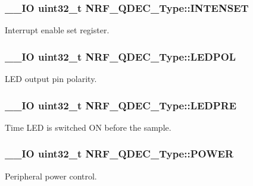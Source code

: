 \subsubsection[{I\+N\+T\+E\+N\+S\+E\+T}]{\setlength{\rightskip}{0pt plus 5cm}\+\_\+\+\_\+\+I\+O uint32\+\_\+t N\+R\+F\+\_\+\+Q\+D\+E\+C\+\_\+\+Type\+::\+I\+N\+T\+E\+N\+S\+E\+T}\label{struct_n_r_f___q_d_e_c___type_a147145269532ef25ff7c7ef4ad3dda64}
Interrupt enable set register. \hypertarget{struct_n_r_f___q_d_e_c___type_ab272c8158314b357bff755f979df7978}{}
\subsubsection[{L\+E\+D\+P\+O\+L}]{\setlength{\rightskip}{0pt plus 5cm}\+\_\+\+\_\+\+I\+O uint32\+\_\+t N\+R\+F\+\_\+\+Q\+D\+E\+C\+\_\+\+Type\+::\+L\+E\+D\+P\+O\+L}\label{struct_n_r_f___q_d_e_c___type_ab272c8158314b357bff755f979df7978}
L\+E\+D output pin polarity. \hypertarget{struct_n_r_f___q_d_e_c___type_af6c064a24141348fd4aad3dcaa3ce936}{}
\subsubsection[{L\+E\+D\+P\+R\+E}]{\setlength{\rightskip}{0pt plus 5cm}\+\_\+\+\_\+\+I\+O uint32\+\_\+t N\+R\+F\+\_\+\+Q\+D\+E\+C\+\_\+\+Type\+::\+L\+E\+D\+P\+R\+E}\label{struct_n_r_f___q_d_e_c___type_af6c064a24141348fd4aad3dcaa3ce936}
Time L\+E\+D is switched O\+N before the sample. \hypertarget{struct_n_r_f___q_d_e_c___type_a61a3a860cc5c616b6c712b60f3390fda}{}
\subsubsection[{P\+O\+W\+E\+R}]{\setlength{\rightskip}{0pt plus 5cm}\+\_\+\+\_\+\+I\+O uint32\+\_\+t N\+R\+F\+\_\+\+Q\+D\+E\+C\+\_\+\+Type\+::\+P\+O\+W\+E\+R}\label{struct_n_r_f___q_d_e_c___type_a61a3a860cc5c616b6c712b60f3390fda}
Peripheral power control. \hypertarget{struct_n_r_f___q_d_e_c___type_a515f7792bdaf582966d3078dc48b5b81}{}

